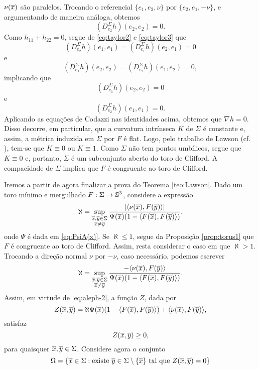 \begin{demonstracao}
$\nu(\overline{x})$ são paralelos. Trocando o referencial $\{ e_1, e_2, \nu \}$
por $\{ e_2, e_1, -\nu \}$, e argumentando de maneira an\'aloga, obtemos
\begin{equation} \label{eq:taylor3}
(D_{e_2}^{\Sigma} h) (e_2,e_2)=0.
\end{equation}
Como $h_{11}+h_{22}=0$, segue de \eqref{eq:taylor2} e \eqref{eq:taylor3}
que
\[
(D_{e_2}^{\Sigma} h) (e_1,e_1) = (D_{e_1}^{\Sigma} h) (e_2,e_1) = 0
\]
e
\[
(D_{e_1}^{\Sigma} h) (e_2,e_2) = (D_{e_2}^{\Sigma} h) (e_1,e_2) = 0,
\]
implicando que 
\[
(D_{e_1}^{\Sigma} h) (e_2,e_2) = 0
\]
e
\[
(D_{e_2}^{\Sigma} h) (e_1,e_1) = 0.
\]
Aplicando as equa\c c\~oes de Codazzi nas identidades acima, 
obtemos que $\nabla h = 0$. Disso decorre, em particular, que a
curvatura intrínseca $K$ de $\Sigma$ é constante e, assim, a 
m\'etrica induzida em $\Sigma$ por $F$ \'e flat. Logo, pelo trabalho
de Lawson (cf. \cite[Corollary 3]{Lawson1969}), tem-se que $K\equiv0$ 
ou $K\equiv1$. Como $\Sigma$ não tem pontos umbílicos, segue que
$K\equiv0$ e, portanto, $\Sigma$ é um subconjunto aberto do toro de 
Clifford. A compacidade de $\Sigma$ implica que $F$ é congruente
ao toro de Clifford.
\end{demonstracao}

Iremos a partir de agora finalizar a prova do Teorema 
\ref{teo:Lawson}. Dado um toro m\'inimo e mergulhado 
$F:\Sigma\to\mathbb{S}^3$, considere
a express\~ao
\begin{equation} \label{eq:aleph-1}
\aleph = \sup_{\substack{\overline{x},\overline{y}\in\Sigma\\ \overline{x}\neq\overline{y}}} 
\frac{|\langle\nu(\overline{x}),F(\overline{y})\rangle|}{\Psi(\overline{x})(1-\langle F(\overline{x}),F(\overline{y})\rangle)},
\end{equation}
onde $\Psi$ \'e dada em \eqref{eq:PsiA(x)}. Se $\aleph\leq1$, segue
da Proposi\c c\~ao \ref{prop:torus1} que $F$ \'e congruente ao toro de
Clifford. Assim, resta considerar o caso em que $\aleph > 1$. Trocando
a dire\c c\~ao normal $\nu$ por $-\nu$, caso necess\'ario, podemos
escrever
\begin{equation} \label{eq:aleph-2}
\aleph = \sup_{\substack{\overline{x},\overline{y}\in\Sigma\\ \overline{x}\neq\overline{y}}} 
\frac{-\langle\nu(\overline{x}),F(\overline{y})\rangle}{\Psi(\overline{x})(1-\langle F(\overline{x}),F(\overline{y})\rangle)}.
\end{equation}
Assim, em virtude de \eqref{eq:aleph-2}, a fun\c c\~ao $Z$, dada por
\begin{equation*}
Z(\overline{x},\overline{y}) = \aleph\Psi(\overline{x})(1-\langle F(\overline{x}),F(\overline{y})\rangle)+
\langle\nu(\overline{x}),F(\overline{y}) \rangle,
\end{equation*}
satisfaz
\begin{equation} \label{eq:aleph-3}
Z(\overline{x},\overline{y})\geq0,
\end{equation}
para quaisquer $\overline{x},\overline{y}\in\Sigma$. Considere agora o conjunto
\begin{equation} \label{eq:ConjOmega}
\Omega = \{\overline{x}\in\Sigma:\mbox{existe} \ \overline{y}\in\Sigma\setminus\{\overline{x}\}
\text{ tal que } Z(\overline{x},\overline{y}) = 0 \}
\end{equation}


